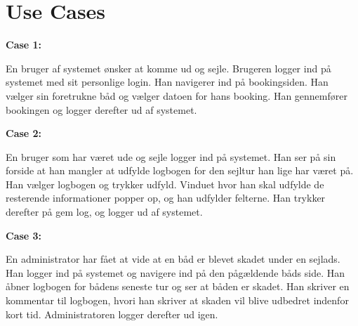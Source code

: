 \chapter{Use Cases}\label{Use_cases}
\cbstart
\textbf{Case 1:}

En bruger af systemet ønsker at komme ud og sejle. Brugeren logger ind på systemet med sit personlige login. Han navigerer ind på bookingsiden. Han vælger sin foretrukne båd og vælger datoen for hans booking. Han gennemfører bookingen og logger derefter ud af systemet.

\textbf{Case 2:}

En bruger som har været ude og sejle logger ind på systemet. Han ser på sin forside at han mangler at udfylde logbogen for den sejltur han lige har været på. Han vælger logbogen og trykker udfyld. Vinduet hvor han skal udfylde de resterende informationer popper op, og han udfylder felterne. Han trykker derefter på gem log, og logger ud af systemet.

\textbf{Case 3:}

En administrator har fået at vide at en båd er blevet skadet under en sejlads. Han logger ind på systemet og navigere ind på den pågældende båds side. Han åbner logbogen for bådens seneste tur og ser at båden er skadet. Han skriver en kommentar til logbogen, hvori han skriver at skaden vil blive udbedret indenfor kort tid. Administratoren logger derefter ud igen.

\cbend